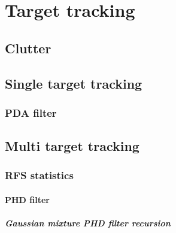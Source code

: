 \chapter{Target tracking}
\section{Clutter}
\section{Single target tracking}
   \subsection{PDA filter}
\section{Multi target tracking}
    \subsection{RFS statistics}
        \subsubsection{PHD filter}
            \paragraph{Gaussian mixture PHD filter recursion}

          